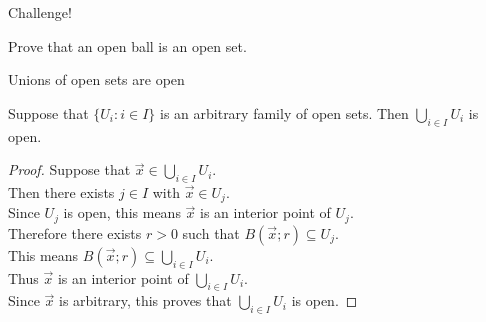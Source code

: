 \documentclass{beamer}
\begin{document}
\begin{frame}{Challenge!}
\begin{prob}
Prove that an open ball is an open set.
\end{prob}
\end{frame}

\begin{frame}{Unions of open sets are open}
\begin{thm}
Suppose that $\{U_i: i\in I\}$ is an arbitrary family of open sets.
Then $\bigcup_{i\in I} U_i$ is open.
\end{thm}
\pause
\begin{proof}
\pause
Suppose that $\vec x\in \bigcup_{i\in I} U_i$.\\
\pause
Then there exists $j\in I$ with $\vec x\in U_j$.\\
\pause
Since $U_j$ is open, this means $\vec x$ is an interior point of $U_j$.\\
\pause
Therefore there exists $r>0$ such that $B(\vec x; r)\subseteq U_j$.\\
\pause
This means $B(\vec x; r)\subseteq \bigcup_{i\in I} U_i$.\\
\pause
Thus $\vec x$ is an interior point of $\bigcup_{i\in I} U_i$.\\
\pause
Since $\vec x$ is arbitrary, this proves that $\bigcup_{i\in I} U_i$ is open.
\end{proof}
\end{frame}
\end{document}
